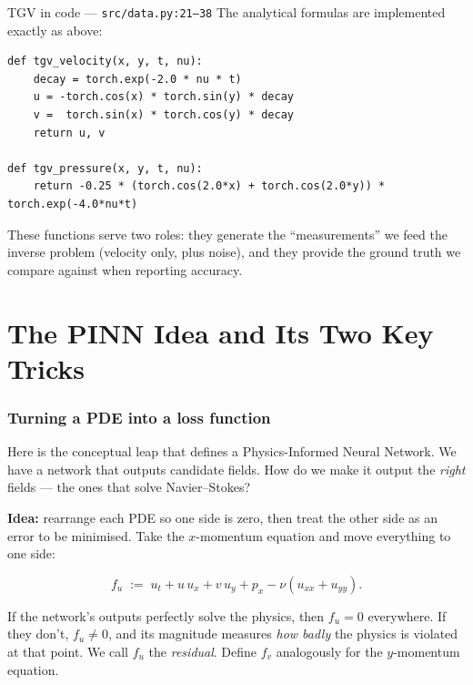 \documentclass[11pt,a4paper]{article}
\begin{document}
\begin{coderef}{TGV in code --- \texttt{src/data.py:21--38}}
The analytical formulas are implemented exactly as above:
\begin{lstlisting}[style=pycode]
def tgv_velocity(x, y, t, nu):
    decay = torch.exp(-2.0 * nu * t)
    u = -torch.cos(x) * torch.sin(y) * decay
    v =  torch.sin(x) * torch.cos(y) * decay
    return u, v

def tgv_pressure(x, y, t, nu):
    return -0.25 * (torch.cos(2.0*x) + torch.cos(2.0*y)) * torch.exp(-4.0*nu*t)
\end{lstlisting}
These functions serve two roles: they generate the ``measurements'' we feed the
inverse problem (velocity only, plus noise), and they provide the ground truth we
compare against when reporting accuracy.
\end{coderef}

\part{The PINN Idea and Its Two Key Tricks}
\label{part:pinn}

\section{Turning a PDE into a loss function}
\label{sec:pde-to-loss}

Here is the conceptual leap that defines a Physics-Informed Neural Network. We
have a network that outputs candidate fields. How do we make it output the
\emph{right} fields --- the ones that solve Navier--Stokes?

\textbf{Idea:} rearrange each PDE so one side is zero, then treat the other side
as an error to be minimised. Take the $x$-momentum equation and move everything
to one side:

\begin{equation}
f_u \;:=\; u_t + u\,u_x + v\,u_y + p_x - \nu(u_{xx}+u_{yy}).
\label{eq:residual-u}
\end{equation}

If the network's outputs perfectly solve the physics, then $f_u = 0$ everywhere.
If they don't, $f_u \neq 0$, and its magnitude measures \emph{how badly} the
physics is violated at that point. We call $f_u$ the \emph{residual}. Define
$f_v$ analogously for the $y$-momentum equation.
\end{document}
